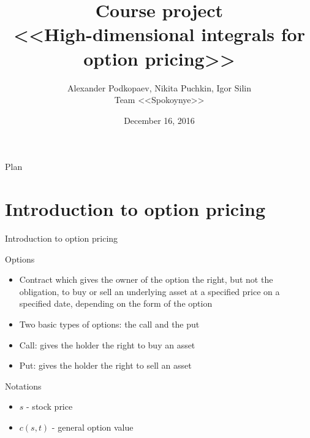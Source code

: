 \documentclass{beamer}
\theoremstyle{definition}
\theoremstyle{plain}
\theoremstyle{remark}
\begin{document}
\setlength{\abovedisplayskip}{5pt}
\setlength{\belowdisplayskip}{5pt}

	\title[\hbox to 60mm{High-dimensional integrals \hfill\insertframenumber\,/\,10}]
			{ Course project \\ <<High-dimensional integrals for option pricing>>}
	\author[A. Podkopaev, N. Puchkin, I. Silin]{\large Alexander Podkopaev, Nikita Puchkin, Igor Silin \\Team <<Spokoynye>>}

\date{\footnotesize{December 16, 2016}}

	\begin{frame}
		\titlepage
	\end{frame}

	\begin{frame}{Plan}
		  \tableofcontents[
		    sectionstyle=show/show,
		    subsectionstyle=show/show/show
		  ]
	\end{frame}
	
	\section{Introduction to option pricing }
	\begin{frame}{Introduction to option pricing}	 
		\begin{block}{Options}
			\begin{itemize}
				\item Contract which gives the owner of the option the right, but not the obligation, to buy or sell an underlying asset at a specified price on a specified date, depending on the form of the option
				\item Two basic types of options: the call and the put
				\item Call: gives the holder the right to buy an asset 
				\item Put: gives the holder the right to sell an asset
			\end{itemize}
		\end{block}
		\begin{block}{Notations}
			\begin{itemize}
				\item $s$ - stock price 
				\item $c(s,t)$ - general option value
			\end{itemize}
		\end{block}	 
	\end{frame}
\end{document}
